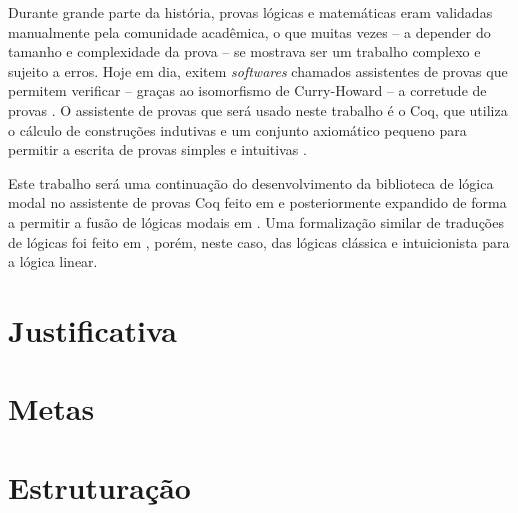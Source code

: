 Durante grande parte da história, provas lógicas e matemáticas eram validadas manualmente pela comunidade acadêmica, o que muitas vezes -- a depender do tamanho e complexidade da prova -- se mostrava ser um trabalho complexo e sujeito a erros. Hoje em dia, exitem \textit{softwares} chamados assistentes de provas que permitem verificar -- graças ao isomorfismo de Curry-Howard -- a corretude de provas \cite{Chlipala}. O assistente de provas que será usado neste trabalho é o Coq, que utiliza o cálculo de construções indutivas e um conjunto axiomático pequeno para permitir a escrita de provas simples e intuitivas \cite{Barras}.

Este trabalho será uma continuação do desenvolvimento da biblioteca de lógica modal no assistente de provas Coq feito em \cite{Silveira} e posteriormente expandido de forma a permitir a fusão de lógicas modais em \cite{Nunes}. Uma formalização similar de traduções de lógicas foi feito em \cite{Sehnem}, porém, neste caso, das lógicas clássica e intuicionista para a lógica linear.

    \section{Justificativa}
    \section{Metas}
    \section{Estruturação}